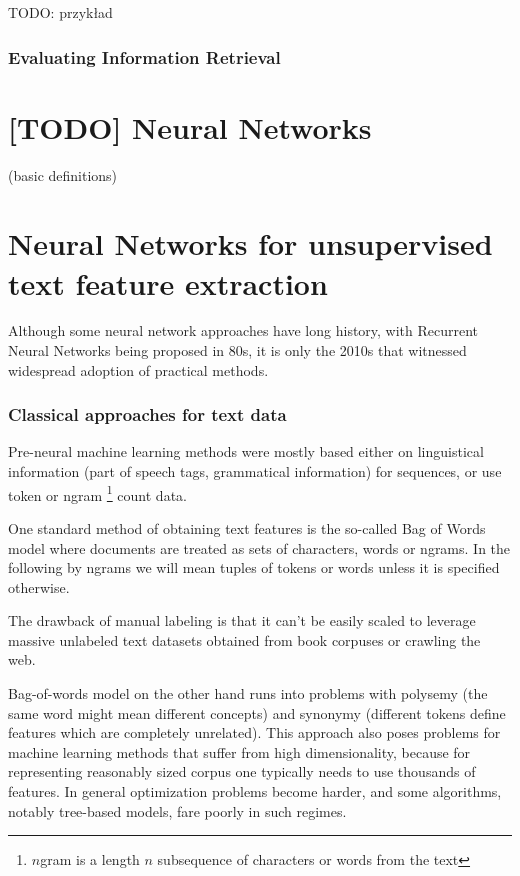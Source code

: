 \documentclass[11pt]{report}
\begin{document}
TODO: przykład

\subsubsection{Evaluating Information Retrieval}

\section{[TODO] Neural Networks}


(basic definitions)

\section{Neural Networks for unsupervised text feature extraction}


Although some neural network approaches have long history, with Recurrent Neural Networks being proposed in 80s, it is only the 2010s that witnessed widespread adoption of practical methods. 

\subsubsection{Classical approaches for text data}


Pre-neural machine learning methods were mostly based either on linguistical information (part of speech tags, grammatical information) for sequences,
or use token or ngram \footnote{$n$gram is a length $n$ subsequence of characters or words from the text} count data.

One standard method of obtaining text features is the so-called Bag of Words model where documents are treated as sets of characters, words or ngrams. In the following by ngrams we will mean tuples of tokens or words unless it is specified otherwise.

The drawback of manual labeling is that it can't be easily scaled to leverage massive unlabeled text datasets obtained from book corpuses or crawling the web.

Bag-of-words model on the other hand runs into problems with polysemy (the same word might mean different concepts) and synonymy (different tokens define features which are completely unrelated).
This approach also poses problems for machine learning methods that suffer from high dimensionality, because for representing reasonably sized corpus one typically needs to use thousands of features.
In general optimization problems become harder, and some algorithms, notably tree-based models, fare poorly in such regimes. 
\end{document}
